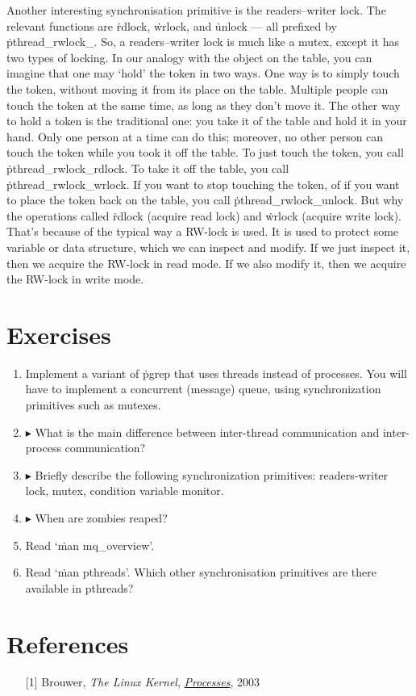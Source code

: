 Another interesting synchronisation primitive is the readers--writer lock.
The relevant functions are
  \.{rdlock}, \.{wrlock}, and \.{unlock}
  --- all prefixed by \.{pthread\_rwlock\_}.
So, a readers--writer lock is much like a mutex, except it has two types of locking.
In our analogy with the object on the table,
  you can imagine that one may `hold' the token in two ways.
One way is to simply touch the token, without moving it from its place on the table.
Multiple people can touch the token at the same time,
  as long as they don't move it.
The other way to hold a token is the traditional one:
  you take it of the table and hold it in your hand.
Only one person at a time can do this;
  moreover, no other person can touch the token while you took it off the table.
To just touch the token, you call \.{pthread\_rwlock\_rdlock}.
To take it off the table, you call \.{pthread\_rwlock\_wrlock}.
If you want to stop touching the token,
  of if you want to place the token back on the table,
  you call \.{pthread\_rwlock\_unlock}.
But why the operations called \.{rdlock} (acquire read lock)
  and \.{wrlock} (acquire write lock).
That's because of the typical way a RW-lock is used.
It is used to protect some variable or data structure,
  which we can inspect and modify.
If we just inspect it, then we acquire the RW-lock in read mode.
If we also modify it, then we acquire the RW-lock in write mode.


\section*{Exercises}

\begin{enumerate}
\item
  Implement a variant of \.{pgrep} that uses threads instead of processes.
  You will have to implement a concurrent (message) queue,
    using synchronization primitives such as mutexes.
\item
  $\blacktriangleright$
  What is the main difference
    between inter-thread communication and inter-process communication?
\item
  $\blacktriangleright$
  Briefly describe the following synchronization primitives:
    readers-writer lock,
    mutex,
    condition variable
    monitor.
\item
  $\blacktriangleright$
  When are zombies reaped?
\item
  Read `\.{man mq\_overview}'.
\item
  Read `\.{man pthreads}'.
  Which other synchronisation primitives are there available in pthreads?
\end{enumerate}


\section*{References}

\begin{itemize}
\item[{[1]}]
  Brouwer,
  \emph{The Linux Kernel},
  \href{https://www.win.tue.nl/~aeb/linux/lk/lk-10.html}{\emph{Processes}},
  2003
\end{itemize}





